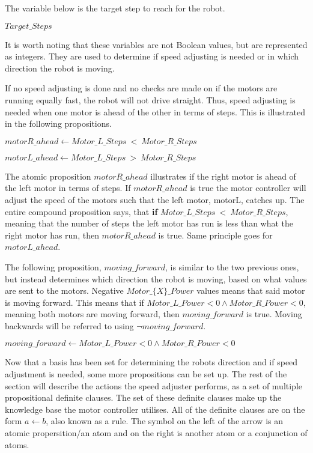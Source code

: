 The variable below is the target step to reach for the robot. 

\hspace{3mm} $Target\_Steps$

It is worth noting that these variables are not Boolean values, but are represented as integers. They are used to determine if speed adjusting is needed or in which direction the robot is moving.

If no speed adjusting is done and no checks are made on if the motors are running equally fast, the robot will not drive straight. Thus, speed adjusting is needed when one motor is ahead of the other in terms of steps. This is illustrated in the following propositions.

\hspace{3mm} $motorR\_ahead \leftarrow Motor\_L\_Steps~<~Motor\_R\_Steps$

\hspace{3mm} $motorL\_ahead \leftarrow Motor\_L\_Steps~>~Motor\_R\_Steps$ 

The atomic proposition $motorR\_ahead$ illustrates if the right motor is ahead of the left motor in terms of steps. If $motorR\_ahead$ is true the motor controller will adjust the speed of the motors such that the left motor, motorL, catches up. The entire compound proposition says, that \textbf{if} $Motor\_L\_Steps~<~Motor\_R\_Steps$, meaning that the number of steps the left motor has run is less than what the right motor has run, then $motorR\_ahead$ is true. Same principle goes for $motorL\_ahead$. 

The following proposition, $moving\_forward$, is similar to the two previous ones, but instead determines which direction the robot is moving, based on what values are sent to the motors. Negative $Motor\_\{X\}\_Power$ values means that said motor is moving forward. This means that if $Motor\_L\_Power < 0 \land Motor\_R\_Power < 0$, meaning both motors are moving forward, then $moving\_forward$ is true. Moving backwards will be referred to using $\lnot moving\_forward$.

\hspace{3mm} $moving\_forward \leftarrow Motor\_L\_Power < 0 \land Motor\_R\_Power < 0$

Now that a basis has been set for determining the robots direction and if speed adjustment is needed, some more propositions can be set up. The rest of the section will describe the actions the speed adjuster performs, as a set of multiple propositional definite clauses. The set of these definite clauses make up the knowledge base the motor controller utilises. All of the definite clauses are on the form $a \leftarrow b$, also known as a rule. The symbol on the left of the arrow is an atomic propersition/an atom and on the right is another atom or a conjunction of atoms.

